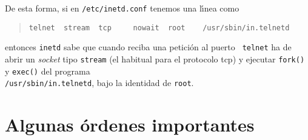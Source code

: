 De esta forma, si en {\tt /etc/inetd.conf} tenemos una l\'{\i}nea como
\begin{quote}
\begin{verbatim}
telnet  stream  tcp     nowait  root    /usr/sbin/in.telnetd
\end{verbatim}
\end{quote}
entonces {\tt inetd} sabe que cuando reciba una petici\'on al puerto {\tt 
telnet} ha de abrir un {\it socket} tipo {\tt stream} (el habitual para el
protocolo {\sc tcp}) y ejecutar {\tt fork()} y {\tt exec()} del programa\\
{\tt /usr/sbin/in.telnetd}, bajo la identidad de {\tt root}.
\section{Algunas \'ordenes importantes}
